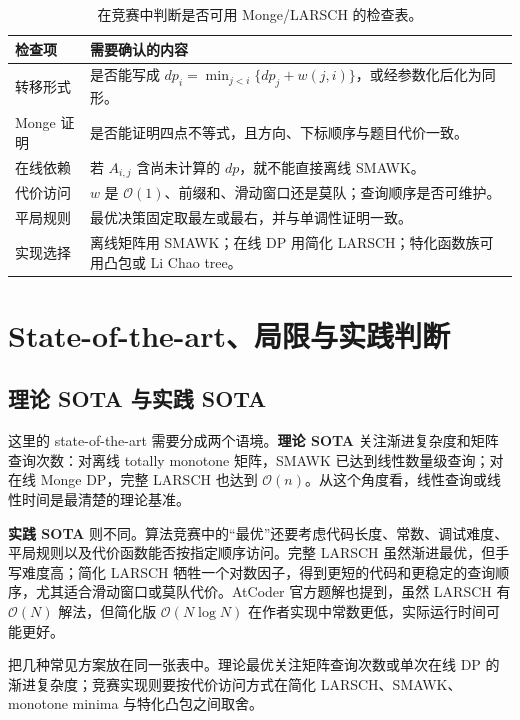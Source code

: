 \documentclass[lang=cn,a4paper,newtx,code=minted,bibtex]{elegantpaper}
\newcommand{\BigO}{\mathcal{O}}
\begin{document}
\begin{table}[H]
\centering
\small
\renewcommand{\arraystretch}{0.92}
\caption{在竞赛中判断是否可用 Monge/LARSCH 的检查表。}
\label{tab:checklist}
\begin{tabular}{p{}p{}}
\toprule
检查项 & 需要确认的内容 \\
\midrule
转移形式 & 是否能写成 $dp_i=\min_{j<i}\{dp_j+w(j,i)\}$，或经参数化后化为同形。 \\
Monge 证明 & 是否能证明四点不等式，且方向、下标顺序与题目代价一致。 \\
在线依赖 & 若 $A_{i,j}$ 含尚未计算的 $dp$，就不能直接离线 SMAWK。 \\
代价访问 & $w$ 是 $\BigO(1)$、前缀和、滑动窗口还是莫队；查询顺序是否可维护。 \\
平局规则 & 最优决策固定取最左或最右，并与单调性证明一致。 \\
实现选择 & 离线矩阵用 SMAWK；在线 DP 用简化 LARSCH；特化函数族可用凸包或 Li Chao tree。 \\
\bottomrule
\end{tabular}
\end{table}

\section{State-of-the-art、局限与实践判断}
\label{sec:sota}


\subsection{理论 SOTA 与实践 SOTA}

这里的 state-of-the-art 需要分成两个语境。\textbf{理论 SOTA} 关注渐进复杂度和矩阵查询次数：对离线 totally monotone 矩阵，SMAWK 已达到线性数量级查询\cite{aggarwal1987geometric}；对在线 Monge DP，完整 LARSCH 也达到 $\BigO(n)$\cite{larmore1991online,noshi2021larschlib}。从这个角度看，线性查询或线性时间是最清楚的理论基准。

\textbf{实践 SOTA} 则不同。算法竞赛中的“最优”还要考虑代码长度、常数、调试难度、平局规则以及代价函数能否按指定顺序访问。完整 LARSCH 虽然渐进最优，但手写难度高；简化 LARSCH 牺牲一个对数因子，得到更短的代码和更稳定的查询顺序，尤其适合滑动窗口或莫队代价。AtCoder 官方题解也提到，虽然 LARSCH 有 $\BigO(N)$ 解法，但简化版 $\BigO(N\log N)$ 在作者实现中常数更低，实际运行时间可能更好\cite{atcoder2024abc355g}。

 把几种常见方案放在同一张表中。理论最优关注矩阵查询次数或单次在线 DP 的渐进复杂度；竞赛实现则要按代价访问方式在简化 LARSCH、SMAWK、monotone minima 与特化凸包之间取舍。
\end{document}
